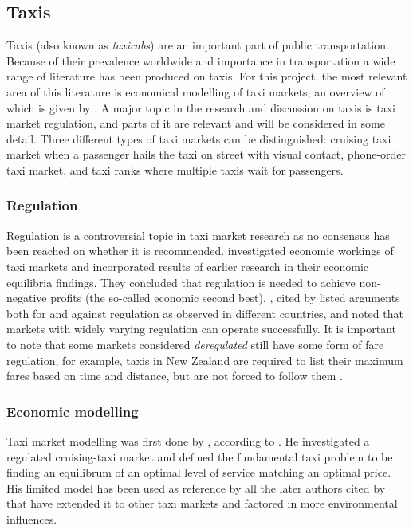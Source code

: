 \subsection{Taxis}
\label{sec:literature:taxis}

Taxis (also known as \textit{taxicabs}) are an important part of public
transportation. Because of their prevalence worldwide and importance in
transportation a wide range of literature has been produced on taxis. For this
project, the most relevant area of this literature is economical modelling of
taxi markets, an overview of which is given by
\textcite{Salanova2011taxi+review}. A major topic in the research and
discussion on taxis is taxi market regulation, and parts of it are relevant and
will be considered in some detail. Three different types of taxi markets can be
distinguished: cruising taxi market when a passenger hails the taxi on street
with visual contact, phone-order taxi market, and taxi ranks where multiple
taxis wait for passengers.

\subsubsection{Regulation}

Regulation is a controversial topic in taxi market research as no consensus has
been reached on whether it is recommended.
\textcite{Cairns1996taxi+competition} investigated economic workings of taxi
markets and incorporated results of earlier research in their economic
equilibria findings. They concluded that regulation is needed to achieve non-
negative profits (the so-called economic second best).
\textcite{Oecd2007taxi+policy}, cited by \textcite{Salanova2011taxi+review}
listed arguments both for and against regulation as observed in different
countries, and noted that markets with widely varying regulation can operate
successfully. It is important to note that some markets considered
\textit{deregulated} still have some form of fare regulation, for example,
taxis in New Zealand are required to list their maximum fares based on time and
distance, but are not forced to follow them
\parencite{Gaunt1995taxi+newzealand}.

\subsubsection{Economic modelling} 
\label{sec:literature:taxis:modelling}

Taxi market modelling was first done by \textcite{Douglas1972taxi+regulation},
according to \textcite{Salanova2011taxi+review}. He investigated a regulated
cruising-taxi market and defined the fundamental taxi problem to be finding an
equilibrum of an optimal level of service matching an optimal price. His
limited model has been used as reference by all the later authors cited by
\textcite{Salanova2011taxi+review} that have extended it to other taxi markets
and factored in more environmental influences.

